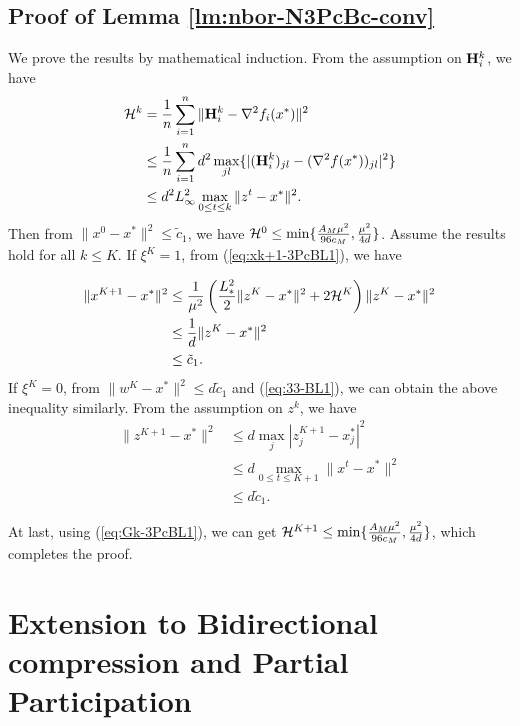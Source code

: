 \documentclass[11pt]{article}
\begin{document}
	
	
	\subsection{Proof of Lemma \ref{lm:nbor-N3PcBc-conv}}
	
	We prove the results by mathematical induction. From the assumption on $\mathbf{H}_i^k$, we have 
	\begin{align}
		{\cal H}^k & = \frac{1}{n} \sum_{i=1}^n \|\mathbf{H}_i^k - \nabla^2 f_i(x^*)\|^2 \nonumber \\ 
		& \leq \frac{1}{n} \sum_{i=1}^n d^2 \max_{jl} \{  | (\mathbf{H}_i^k)_{jl} - (\nabla^2 f(x^*))_{jl} |^2  \} \nonumber \\ 
		& \leq d^2 L_{\infty}^2 \max_{0\leq t \leq k} \|z^t-x^*\|^2. \label{eq:Gk-3PcBL1}
	\end{align}
	Then from $\|x^0-x^*\|^2 \leq {\tilde c}_1$, we have ${\cal H}^0 \leq \min \{  \frac{A_M\mu^2}{96c_M}, \frac{\mu^2}{4d}  \}$. Assume the results hold for all $k\leq K$. If $\xi^K=1$, from (\ref{eq:xk+1-3PcBL1}), we have 
	
	\begin{align*}
		\|x^{K+1} - x^*\|^2 & \leq \frac{1}{\mu^2} \left(  \frac{L_{*}^2}{2} \|z^K-x^*\|^2 + 2{\cal H}^K  \right) \|z^K-x^*\|^2 \\ 
		& \leq \frac{1}{d}\|z^K-x^*\|^2 \\ 
		& \leq {\tilde c}_1. 
	\end{align*}
	If $\xi^K=0$, from $\|w^K-x^*\|^2 \leq d {\tilde c}_1$ and (\ref{eq:33-BL1}), we can obtain the above inequality similarly. From the assumption on $z^k$, we have 
	\begin{align*}
		\|z^{K+1} - x^*\|^2 & \leq d \max_{j} | z_j^{K+1} -x_j^* |^2 \\ 
		& \leq d \max_{0\leq t\leq K+1} \|x^t-x^*\|^2 \\ 
		& \leq d {\tilde c}_1. 
	\end{align*}
	
	At last, using (\ref{eq:Gk-3PcBL1}), we can get ${\cal H}^{K+1} \leq \min \{  \frac{A_M\mu^2}{96c_M}, \frac{\mu^2}{4d}  \}$, which completes the proof. 
	
	
	
	
	\section{Extension to Bidirectional compression and Partial Participation}
	
\end{document}
